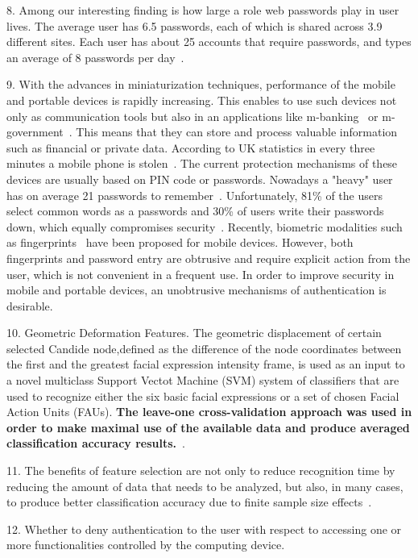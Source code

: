 8. Among our interesting finding is how large a role web passwords play in user lives. The average user has 6.5 passwords, each of which is shared across 3.9 different sites. Each user has about 25 accounts that require passwords, and types an average of 8 passwords per day~\cite{florencio2007}.

9. With the advances in miniaturization techniques, performance of the mobile and portable devices is rapidly increasing. This enables to use such devices not only as communication tools but also in an applications like m-banking~\cite{Pousttchi2004Assessment} or m-government~\cite{Kim1970Architecture}. This means that they can store and process valuable information such as financial or private data. According to UK statistics in every three minutes a mobile phone is stolen~\cite{hugeSurge2006}. The current protection mechanisms of these devices are usually based on PIN code or passwords. Nowadays a "heavy" user has on average 21 passwords to remember~\cite{2002NATMonitor}. Unfortunately, 81\% of the users select common words as a passwords and 30\% of users write their passwords down, which equally compromises security~\cite{2002NATMonitor}. Recently, biometric modalities such as fingerprints~\cite{Su2005A,Chen2005A} have been proposed for mobile devices. However, both fingerprints and password entry are obtrusive and require explicit action from the user, which is not convenient in a frequent use. In order to improve security in mobile and portable devices, an unobtrusive mechanisms of authentication is desirable.

10. Geometric Deformation Features. The geometric displacement of certain selected Candide node,defined as the difference of the node coordinates between the first and the greatest facial expression intensity frame, is used as an input to a novel multiclass Support Vectot Machine (SVM) system of classifiers that are used to recognize either the six basic facial expressions or a set of chosen Facial Action Units (FAUs).
\textbf{The leave-one cross-validation approach was used in order to make maximal use of the available data and produce averaged classification accuracy results.}~\cite{Kotsia2007Facial}.

11. The benefits of feature selection are not only to reduce recognition time by reducing the amount of data that needs to be analyzed, but also, in many cases, to produce better classification accuracy due to finite sample size effects~\cite{Jain1997Feature}.

12. Whether to deny authentication to the user with respect to accessing one or more functionalities controlled by the computing device. 

